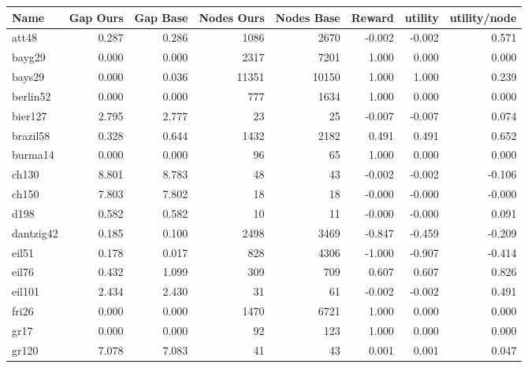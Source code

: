 \begin{tabular}{lrrrrrrr}
\toprule
     Name &  Gap Ours &  Gap Base &  Nodes Ours &  Nodes Base &  Reward &  utility &  utility/node \\
\midrule
    att48 &     0.287 &     0.286 &        1086 &        2670 &  -0.002 &   -0.002 &         0.571 \\
   bayg29 &     0.000 &     0.000 &        2317 &        7201 &   1.000 &    0.000 &         0.000 \\
   bays29 &     0.000 &     0.036 &       11351 &       10150 &   1.000 &    1.000 &         0.239 \\
 berlin52 &     0.000 &     0.000 &         777 &        1634 &   1.000 &    0.000 &         0.000 \\
  bier127 &     2.795 &     2.777 &          23 &          25 &  -0.007 &   -0.007 &         0.074 \\
 brazil58 &     0.328 &     0.644 &        1432 &        2182 &   0.491 &    0.491 &         0.652 \\
  burma14 &     0.000 &     0.000 &          96 &          65 &   1.000 &    0.000 &         0.000 \\
    ch130 &     8.801 &     8.783 &          48 &          43 &  -0.002 &   -0.002 &        -0.106 \\
    ch150 &     7.803 &     7.802 &          18 &          18 &  -0.000 &   -0.000 &        -0.000 \\
     d198 &     0.582 &     0.582 &          10 &          11 &  -0.000 &   -0.000 &         0.091 \\
dantzig42 &     0.185 &     0.100 &        2498 &        3469 &  -0.847 &   -0.459 &        -0.209 \\
    eil51 &     0.178 &     0.017 &         828 &        4306 &  -1.000 &   -0.907 &        -0.414 \\
    eil76 &     0.432 &     1.099 &         309 &         709 &   0.607 &    0.607 &         0.826 \\
   eil101 &     2.434 &     2.430 &          31 &          61 &  -0.002 &   -0.002 &         0.491 \\
    fri26 &     0.000 &     0.000 &        1470 &        6721 &   1.000 &    0.000 &         0.000 \\
     gr17 &     0.000 &     0.000 &          92 &         123 &   1.000 &    0.000 &         0.000 \\
    gr120 &     7.078 &     7.083 &          41 &          43 &   0.001 &    0.001 &         0.047 \\

\end{tabular}
